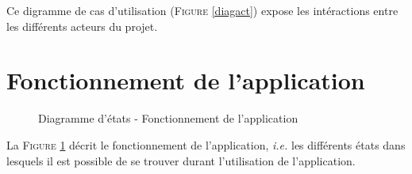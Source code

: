 \documentclass[a4paper,twoside,10pt]{report}
\begin{document}
  Ce digramme de cas d'utilisation (\textsc{Figure} \ref{diagact}) expose les intéractions entre les différents acteurs du projet.
  
\section{Fonctionnement de l'application}
  
  \begin{figure}[h]
  \begin{center}
   \caption{Diagramme d'états - Fonctionnement de l'application}
   \label{etattrans}
  \end{center}
  \end{figure}
  
  La \textsc{Figure} \ref{etattrans} décrit le fonctionnement de l'application, \textit{i.e.} les différents états dans lesquels il est possible de se trouver durant l'utilisation de l'application.
  
\end{document}
